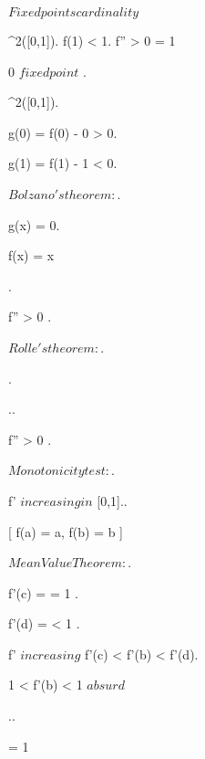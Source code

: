 \documentclass[../Main/main]{subfiles}
\begin{document}
\unit{ $ Fixed points cardinality $ }
{
	{
		{
			 \in \Cc^2([0,1]).
			f(1) < 1.
			f'' > 0 \in [0,1]
		}
		\showthat
		{
			 = 1
		}
		\demonstration
		{
			{
				
				{
					0 $ fixed point $
				}.
				{
					 \in \Cc^2([0,1]).

					g(0) = f(0) - 0 > 0.

					g(1) = f(1) - 1 < 0.

					$Bolzano's theorem: $.

					{
						g(x) = 0.

						f(x) = x
					}
				}


			}.
			
			{
				f'' > 0 \in [0,1].

				$Rolle's theorem:$.

				 .

				 ..



				f'' > 0 \in [0,1].

				$Monotonicity test:$.

				f' $ increasing in $ [0,1]..



				\all{ a < b \in [0,1) }[ f(a) = a, f(b) = b ]
				{
					$Mean Value Theorem:$.

					{
						f'(c) =  = 1
					}.

					{
						f'(d) =  < 1
					}.

					f' $ increasing $ \imp f'(c) < f'(b) < f'(d).

					1 < f'(b) < 1 $ absurd $
				}				 

			}..

			\conclude {} = 1

		}
	}
}
\end{document}
